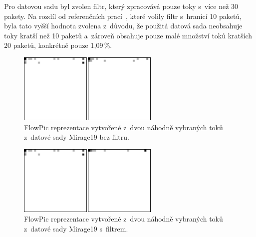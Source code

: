 \begin{table}[H]
    \centering
    \caption{Analýza datové sady Mirage19 s~filtrem >30pkts.}
    \label{mirage19_filter}
\end{table}

Pro datovou sadu byl zvolen filtr, který zpracovává pouze toky s~více než 30 pakety. Na rozdíl od referenčních prací~\cite{huawei_paper}, které volily filtr s~hranicí 10 paketů, byla tato vyšší hodnota zvolena z~důvodu, že použitá datová sada neobsahuje toky kratší než 10 paketů a~zároveň obsahuje pouze malé množství toků kratších 20 paketů, konkrétně pouze 1,09\,\%.

\begin{figure}[H]
	\centering
	\includegraphics[width=0.6\textwidth]{obrazky-figures/m19_flowpics.png}
	\caption{FlowPic reprezentace vytvořené z~dvou náhodně vybraných toků z~datové sady Mirage19 bez filtru.}
	\label{m19_flowpic}
\end{figure}

\begin{figure}[H]
	\centering
	\includegraphics[width=0.6\textwidth]{obrazky-figures/f_m19_flowpics.png}
	\caption{FlowPic reprezentace vytvořené z~dvou náhodně vybraných toků z~datové sady Mirage19 s~filtrem.}
	\label{f_m19_flowpic}
\end{figure}

